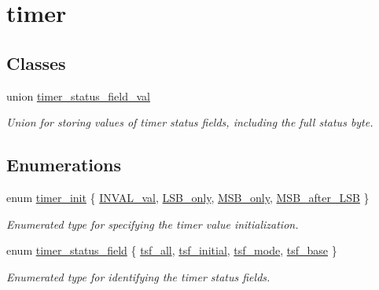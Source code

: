 \hypertarget{group__timer}{}\section{timer}
\label{group__timer}
\subsection*{Classes}
\begin{DoxyCompactItemize}
\item 
union \hyperlink{uniontimer__status__field__val}{timer\+\_\+status\+\_\+field\+\_\+val}
\begin{DoxyCompactList}\small\item\em Union for storing values of timer status fields, including the full status byte. \end{DoxyCompactList}\end{DoxyCompactItemize}
\subsection*{Enumerations}
\begin{DoxyCompactItemize}
\item 
enum \hyperlink{group__timer_ga5cc20f14fd50625eea9b20f58fbe2a55}{timer\+\_\+init} \{ \hyperlink{group__timer_gga5cc20f14fd50625eea9b20f58fbe2a55a829d958875d8e92068f1b07f858721a4}{I\+N\+V\+A\+L\+\_\+val}, 
\hyperlink{group__timer_gga5cc20f14fd50625eea9b20f58fbe2a55a9a2e8b22f6d5ee33cc37829164a55955}{L\+S\+B\+\_\+only}, 
\hyperlink{group__timer_gga5cc20f14fd50625eea9b20f58fbe2a55ae46d93c3576b5f78ae1aeb4ee4fc4938}{M\+S\+B\+\_\+only}, 
\hyperlink{group__timer_gga5cc20f14fd50625eea9b20f58fbe2a55a7d392c02b4f52d93c10e4c646f8cedc7}{M\+S\+B\+\_\+after\+\_\+\+L\+SB}
 \}\begin{DoxyCompactList}\small\item\em Enumerated type for specifying the timer value initialization. \end{DoxyCompactList}
\item 
enum \hyperlink{group__timer_gada782f3116a896caaa602b70c0c6d8b7}{timer\+\_\+status\+\_\+field} \{ \hyperlink{group__timer_ggada782f3116a896caaa602b70c0c6d8b7a92376d84969da91547254fc7461f0da2}{tsf\+\_\+all}, 
\hyperlink{group__timer_ggada782f3116a896caaa602b70c0c6d8b7aa89f72faf31fa0e4db8cab25364a4583}{tsf\+\_\+initial}, 
\hyperlink{group__timer_ggada782f3116a896caaa602b70c0c6d8b7aa84c2f6462a2deb90fda229c89453dfa}{tsf\+\_\+mode}, 
\hyperlink{group__timer_ggada782f3116a896caaa602b70c0c6d8b7af4b69eace6b1cc952de198acee4c5e32}{tsf\+\_\+base}
 \}\begin{DoxyCompactList}\small\item\em Enumerated type for identifying the timer status fields. \end{DoxyCompactList}
\end{DoxyCompactItemize}
